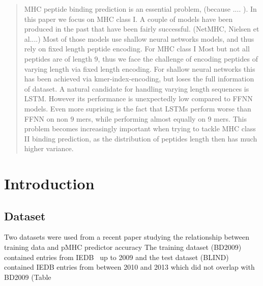 \documentclass{article} %
\begin{document}
\begin{abstract}
\vspace{-0.15cm}

MHC peptide binding prediction is an essential problem, (because .... ). In this paper we focus on MHC class I. A couple of models have been produced in the past that have been fairly successful. (NetMHC, Nielsen et al....) Most of those models use shallow neural networks models, and thus rely on fixed length peptide encoding. For MHC class I Most but not all peptides are of length 9, thus we face the challenge of encoding peptides of varying length via fixed length encoding. For shallow neural networks this has been achieved via kmer-index-encoding, but loses the full information of dataset. A natural candidate for handling varying length sequences is LSTM. However its performance is unexpectedly low compared to FFNN models. Even more suprising is the fact that LSTMs perform worse than FFNN on non 9 mers, while performing almost equally on 9 mers. This problem becomes increasingly important when trying to tackle MHC class II binding prediction, as the distribution of peptides length then has much higher variance. 

\vspace{-0.2cm}

\end{abstract}



\section{Introduction}
\vspace{-0.1cm}




\subsection{Dataset}

Two datasets were used from a recent paper studying the relationship between training data and pMHC predictor accuracy%
The training dataset (BD2009) contained entries from IEDB~%
up to 2009 and the test dataset (BLIND) contained IEDB entries from between 2010 and 2013 which did not overlap with BD2009 (Table~%
\end{document}
